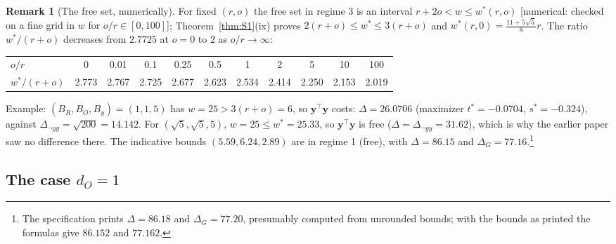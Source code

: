 \documentclass[11pt]{article}
\theoremstyle{definition}
\newtheorem{remark}[definition]{Remark}
\theoremstyle{plain}
\newcommand{\by}{\mathbf{y}}
\newcommand{\status}[1]{\textsf{\small[#1]}}
\begin{document}
\begin{remark}[The free set, numerically]\label{rem:freeset}
For fixed $(r,o)$ the free set in regime 3 is an interval $r+2o<w\le w^*(r,o)$ \status{numerical: checked on a fine grid in $w$ for $o/r\in[0,100]$}; Theorem~\ref{thm:S1}(ix) proves $2(r+o)\le w^*\le3(r+o)$ and $w^*(r,0)=\frac{11+5\sqrt5}8r$. The ratio $w^*/(r+o)$ decreases from $2.7725$ at $o=0$ to $2$ as $o/r\to\infty$:
\begin{center}\small
\begin{tabular}{@{}lcccccccccc@{}}
\toprule
$o/r$ & 0 & 0.01 & 0.1 & 0.25 & 0.5 & 1 & 2 & 5 & 10 & 100\\
$w^*/(r+o)$ & 2.773 & 2.767 & 2.725 & 2.677 & 2.623 & 2.534 & 2.414 & 2.250 & 2.153 & 2.019\\
\bottomrule
\end{tabular}
\end{center}
Example: $(B_R,B_O,B_y)=(1,1,5)$ has $w=25>3(r+o)=6$, so $\by^\top\by$ costs: $\Delta=26.0706$ (maximizer $t^*=-0.0704$, $s^*=-0.324$), against $\Delta_{\neg yy}=\sqrt{200}=14.142$. For $(\sqrt5,\sqrt5,5)$, $w=25\le w^*=25.33$, so $\by^\top\by$ is free ($\Delta=\Delta_{\neg yy}=31.62$), which is why the earlier paper saw no difference there. The indicative bounds $(5.59,6.24,2.89)$ are in regime 1 (free), with $\Delta=86.15$ and $\Delta_G=77.16$.\footnote{The specification prints $\Delta=86.18$ and $\Delta_G=77.20$, presumably computed from unrounded bounds; with the bounds as printed the formulas give $86.152$ and $77.162$.}
\end{remark}

\subsection{The case \texorpdfstring{$d_O=1$}{dO=1}}
\end{document}
